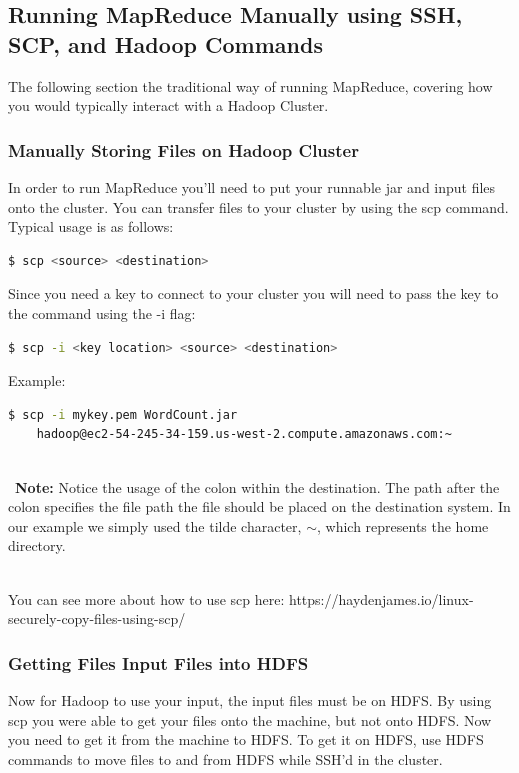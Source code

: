 \documentclass{article}
\begin{document}
\subsection{Running MapReduce Manually using SSH, SCP, and Hadoop Commands}
The following section the traditional way of running MapReduce, covering how you would typically interact with a Hadoop Cluster.

\subsubsection{Manually Storing Files on Hadoop Cluster}
In order to run MapReduce you'll need to put your runnable jar and input files onto the cluster. You can transfer files to your cluster by using the scp command. Typical usage is as follows:
\begin{lstlisting}[language=bash]
  $ scp <source> <destination>
\end{lstlisting} 
Since you need a key to connect to your cluster you will need to pass the key to the command using the -i flag:
\begin{lstlisting}[language=bash]
  $ scp -i <key location> <source> <destination>
\end{lstlisting}
Example:
\begin{lstlisting}[language=bash]
  $ scp -i mykey.pem WordCount.jar 
    hadoop@ec2-54-245-34-159.us-west-2.compute.amazonaws.com:~
\end{lstlisting}
\-\\\ \textbf{Note:} Notice the usage of the colon within the destination. The path after the colon specifies the file path the file should be placed on the destination system. In our example we simply used the tilde character, $\sim$, which represents the home directory.

\-\ \\ You can see more about how to use scp here: https://haydenjames.io/linux-securely-copy-files-using-scp/

\subsubsection{Getting Files Input Files into HDFS}
Now for Hadoop to use your input, the input files must be on HDFS. By using scp you were able to get your files onto the machine, but not onto HDFS. Now you need to get it from the machine to HDFS. To get it on HDFS, use HDFS commands to move files to and from HDFS while SSH'd in the cluster.
\end{document}
